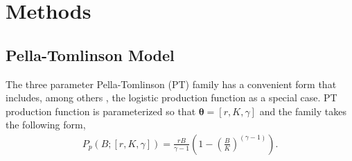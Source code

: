 \documentclass[12pt]{article}
\begin{document}
%
\section{Methods \label{meth}}
%
\subsection{Pella-Tomlinson Model}


%
The three parameter Pella-Tomlinson (PT) family has a convenient form that includes, among 
others , the 
logistic production function as a special case. %
PT production function is parameterized so that $\bm{\theta} = [r, K, \gamma]$ 
and the family takes the following form, 
\begin{align}
P_{p}(B; [r, K, \gamma]) = \frac{r B}{\gamma-1} \left(1-\left(\frac{B}{K}\right)^{(\gamma-1)}\right). \label{pt}
\end{align}

\clearpage
\end{document}
